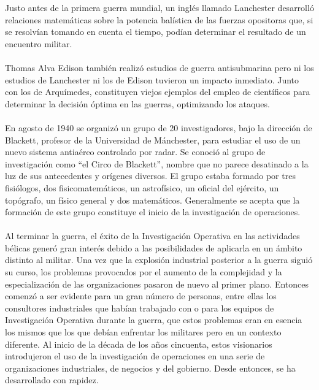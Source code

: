 \documentclass[12pt, a4paper,spanish]{article}
\begin{document}
		Justo antes de la primera guerra mundial, un inglés llamado Lanchester desarrolló relaciones matemáticas sobre la potencia balística de las fuerzas opositoras que, si se resolvían tomando en cuenta el tiempo, podían determinar el resultado de un encuentro militar.\cite{wikipedia_IO}

		\paragraph{}
		Thomas Alva Edison también realizó estudios de guerra antisubmarina pero ni los estudios de Lanchester ni los de Edison tuvieron un impacto inmediato. Junto con los de Arquímedes, constituyen viejos ejemplos del empleo de científicos para determinar la decisión óptima en las guerras, optimizando los ataques. \cite{wikipedia_IO}

		\paragraph{}
		En agosto de 1940 se organizó un grupo de 20 investigadores, bajo la dirección de Blackett, profesor de la Universidad de Mánchester, para estudiar el uso de un nuevo sistema antiaéreo controlado por radar. Se conoció al grupo de investigación como “el Circo de Blackett”, nombre que no parece desatinado a la luz de sus antecedentes y orígenes diversos. El grupo estaba formado por tres fisiólogos, dos fisicomatemáticos, un astrofísico, un oficial del ejército, un topógrafo, un físico general y dos matemáticos. Generalmente se acepta que la formación de este grupo constituye el inicio de la investigación de operaciones. \cite{wikipedia_IO}

		\paragraph{}
		Al terminar la guerra, el éxito de la Investigación Operativa en las actividades bélicas generó gran interés debido a las posibilidades de aplicarla en un ámbito distinto al militar. Una vez que la explosión industrial posterior a la guerra siguió su curso, los problemas provocados por el aumento de la complejidad y la especialización de las organizaciones pasaron de nuevo al primer plano. Entonces comenzó a ser evidente para un gran número de personas, entre ellas los consultores industriales que habían trabajado con o para los equipos de Investigación Operativa durante la guerra, que estos problemas eran en esencia los mismos que los que debían enfrentar los militares pero en un contexto diferente. Al inicio de la década de los años cincuenta, estos visionarios introdujeron el uso de la investigación de operaciones en una serie de organizaciones industriales, de negocios y del gobierno. Desde entonces, se ha desarrollado con rapidez. \cite{hillier_lieberman_IO}
\end{document}

